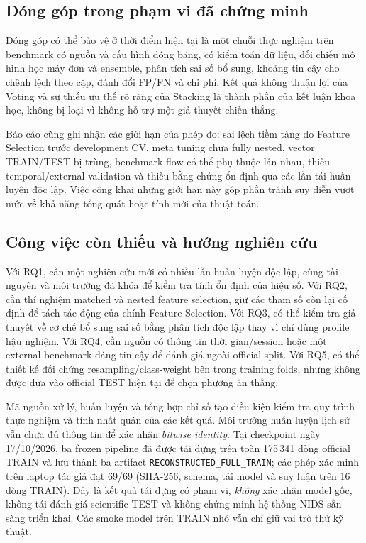 \subsection{Đóng góp trong phạm vi đã chứng minh}
Đóng góp có thể bảo vệ ở thời điểm hiện tại là một chuỗi thực nghiệm trên benchmark có nguồn và cấu hình đóng băng, có kiểm toán dữ liệu, đối chiếu mô hình học máy đơn và ensemble, phân tích sai số bổ sung, khoảng tin cậy cho chênh lệch theo cặp, đánh đổi FP/FN và chi phí. Kết quả không thuận lợi của Voting và sự thiếu ưu thế rõ ràng của Stacking là thành phần của kết luận khoa học, không bị loại vì không hỗ trợ một giả thuyết chiến thắng.

Báo cáo cũng ghi nhận các giới hạn của phép đo: sai lệch tiềm tàng do Feature Selection trước development CV, meta tuning chưa fully nested, vector TRAIN/TEST bị trùng, benchmark flow có thể phụ thuộc lẫn nhau, thiếu temporal/external validation và thiếu bằng chứng ổn định qua các lần tái huấn luyện độc lập. Việc công khai những giới hạn này góp phần tránh suy diễn vượt mức về khả năng tổng quát hoặc tính mới của thuật toán.

\subsection{Công việc còn thiếu và hướng nghiên cứu}
Với RQ1, cần một nghiên cứu mới có nhiều lần huấn luyện độc lập, cùng tài nguyên và môi trường đã khóa để kiểm tra tính ổn định của hiệu số. Với RQ2, cần thí nghiệm matched và nested feature selection, giữ các tham số còn lại cố định để tách tác động của chính Feature Selection. Với RQ3, có thể kiểm tra giả thuyết về cơ chế bổ sung sai số bằng phân tích độc lập thay vì chỉ dùng profile hậu nghiệm. Với RQ4, cần nguồn có thông tin thời gian/session hoặc một external benchmark đáng tin cậy để đánh giá ngoài official split. Với RQ5, có thể thiết kế đối chứng resampling/class-weight bên trong training folds, nhưng không được dựa vào official TEST hiện tại để chọn phương án thắng.

Mã nguồn xử lý, huấn luyện và tổng hợp chỉ số tạo điều kiện kiểm tra quy trình thực nghiệm và tính nhất quán của các kết quả. Môi trường huấn luyện lịch sử vẫn chưa đủ thông tin để xác nhận \emph{bitwise identity}. Tại checkpoint ngày 17/10/2026, ba frozen pipeline đã được tái dựng trên toàn 175\,341 dòng official TRAIN và lưu thành ba artifact \texttt{RECONSTRUCTED\_FULL\_TRAIN}; các phép xác minh trên laptop tác giả đạt 69/69 (SHA-256, schema, tải model và suy luận trên 16 dòng TRAIN). Đây là kết quả tái dựng có phạm vi, \emph{không} xác nhận model gốc, không tái đánh giá scientific TEST và không chứng minh hệ thống NIDS sẵn sàng triển khai. Các smoke model trên TRAIN nhỏ vẫn chỉ giữ vai trò thử kỹ thuật.

